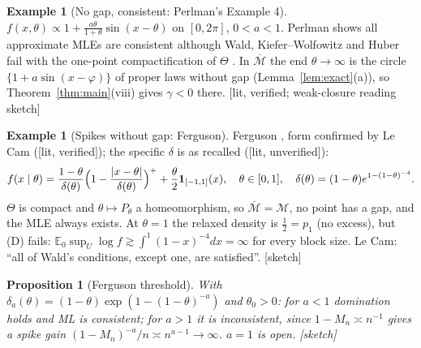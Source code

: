 \documentclass[11pt]{article}
\newcommand{\E}{\mathbb E}
\newcommand{\cM}{\mathcal M}
\newcommand{\bM}{\overline{\mathcal M}}
\newcommand{\status}[1]{\textsf{[#1]}}
\newtheorem{proposition}[theorem]{Proposition}
\theoremstyle{definition}
\newtheorem{example}[theorem]{Example}
\theoremstyle{remark}
\begin{document}
\begin{example}[No gap, consistent: Perlman's Example 4]
$f(x,\theta)\propto1+\frac{a\theta}{1+\theta}\sin(x-\theta)$ on $[0,2\pi]$,
$0<a<1$. Perlman shows all approximate MLEs are consistent although Wald,
Kiefer--Wolfowitz and Huber fail with the one-point compactification of
$\Theta$ \cite{perlman}. In $\bM$ the end $\theta\to\infty$ is the circle
$\{1+a\sin(x-\varphi)\}$ of proper laws without gap (Lemma~\ref{lem:exact}(a)),
so Theorem~\ref{thm:main}(viii) gives $\gamma<0$ there.
\status{lit, verified; weak-closure reading sketch}
\end{example}

\begin{example}[Spikes without gap: Ferguson]\label{ex:ferguson}
Ferguson \cite{ferguson}, form confirmed by Le Cam \cite{lecam}
(\status{lit, verified}); the specific $\delta$ is as recalled
(\status{lit, unverified}):
\[
 f(x\mid\theta)=\frac{1-\theta}{\delta(\theta)}
 \Bigl(1-\frac{|x-\theta|}{\delta(\theta)}\Bigr)^{+}+\frac\theta2\mathbf 1_{[-1,1]}(x),
 \quad\theta\in[0,1],\quad \delta(\theta)=(1-\theta)e^{1-(1-\theta)^{-4}}.
\]
$\Theta$ is compact and $\theta\mapsto P_\theta$ a homeomorphism, so
$\bM=\cM$, no point has a gap, and the MLE always exists. At $\theta=1$ the
relaxed density is $\frac12=p_1$ (no excess), but (D) fails:
$\E_0\sup_U\log f\gtrsim\int^1(1-x)^{-4}dx=\infty$ for every block size.
Le Cam: ``all of Wald's conditions, except one, are satisfied''.
\status{sketch}
\end{example}

\begin{proposition}[Ferguson threshold]
With $\delta_a(\theta)=(1-\theta)\exp(1-(1-\theta)^{-a})$ and $\theta_0>0$:
for $a<1$ domination holds and ML is consistent; for $a>1$ it is
inconsistent, since $1-M_n\asymp n^{-1}$ gives a spike gain
$(1-M_n)^{-a}/n\asymp n^{a-1}\to\infty$. $a=1$ is open. \status{sketch}
\end{proposition}
\end{document}
